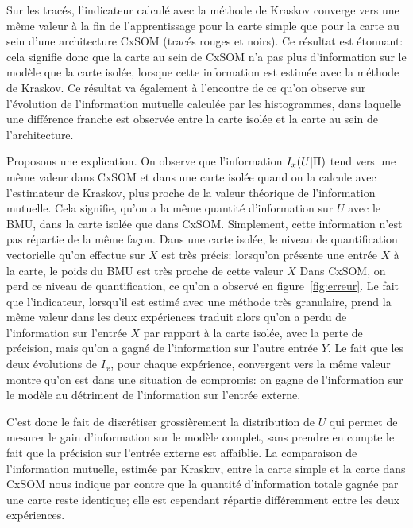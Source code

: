 Sur les tracés, l'indicateur calculé avec la méthode de Kraskov converge vers une même valeur à la fin de l'apprentissage pour la carte simple que pour la carte au sein d'une architecture CxSOM (tracés rouges et noirs). Ce résultat est étonnant: cela signifie donc que la carte au sein de CxSOM n'a pas plus d'information sur le modèle que la carte isolée, lorsque cette information est estimée avec la méthode de Kraskov. Ce résultat va également à l'encontre de ce qu'on observe sur l'évolution de l'information mutuelle calculée par les histogrammes, dans laquelle une différence franche est observée entre la carte isolée et la carte au sein de l'architecture.

Proposons une explication.
On observe que l'information $I_x(U|\Pi)$ tend vers une même valeur dans CxSOM et dans une carte isolée quand on la calcule avec l'estimateur de Kraskov, plus proche de la valeur théorique de l'information mutuelle. Cela signifie, qu'on a la même quantité d'information sur $U$ avec le BMU, dans la carte isolée que dans CxSOM. Simplement, cette information n'est pas répartie de la même façon. 
Dans une carte isolée, le niveau de quantification vectorielle qu'on effectue sur $X$ est très précis: lorsqu'on présente une entrée $X$ à la carte, le poids du BMU est très proche de cette valeur $X$ Dans CxSOM, on perd ce niveau de quantification, ce qu'on a observé en figure~\ref{fig:erreur}. Le fait que l'indicateur, lorsqu'il est estimé avec une méthode très granulaire, prend la même valeur dans les deux expériences traduit alors qu'on a perdu de l'information sur l'entrée $X$ par rapport à la carte isolée, avec la perte de précision, mais qu'on a gagné de l'information sur l'autre entrée $Y$. Le fait que les deux évolutions de $I_x$, pour chaque expérience, convergent vers la même valeur montre qu'on est dans une situation de compromis: on gagne de l'information sur le modèle au détriment de l'information sur l'entrée externe.

C'est donc le fait de discrétiser grossièrement la distribution de $U$ qui permet de mesurer le gain d'information sur le modèle complet, sans prendre en compte le fait que la précision sur l'entrée externe est affaiblie. La comparaison de l'information mutuelle, estimée par Kraskov, entre la carte simple et la carte dans CxSOM nous indique par contre que la quantité d'information totale gagnée par une carte reste identique; elle est cependant répartie différemment entre les deux expériences.



